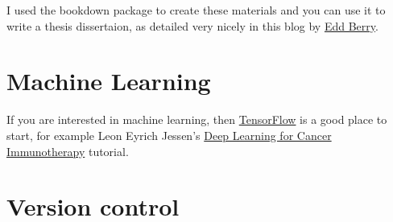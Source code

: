 \documentclass[12pt,]{book}
\theoremstyle{definition}
\theoremstyle{definition}
\theoremstyle{definition}
\theoremstyle{remark}
\begin{document}
I used the bookdown package to create these materials \citep{R-bookdown}
and you can use it to write a thesis dissertaion, as detailed very
nicely in this blog by
\href{https://eddjberry.netlify.com/post/writing-your-thesis-with-bookdown/}{Edd
Berry}.

\section{Machine Learning}\label{machine-learning}

If you are interested in machine learning, then
\href{https://tensorflow.rstudio.com/}{TensorFlow} is a good place to
start, for example Leon Eyrich Jessen's
\href{https://tensorflow.rstudio.com/blog/dl-for-cancer-immunotherapy.html}{Deep
Learning for Cancer Immunotherapy} tutorial.

\section{Version control}\label{version-control}


\end{document}
